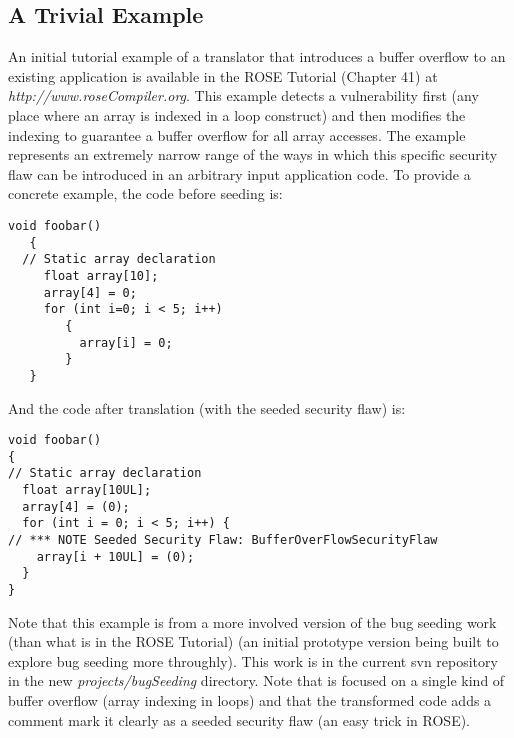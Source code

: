 \subsection{A Trivial Example}

   An initial tutorial example of a translator that introduces a 
buffer overflow to an existing application is available in the ROSE Tutorial
(Chapter 41) at {\em http://www.roseCompiler.org}.  This example detects a
vulnerability first (any place where an array is indexed in a loop construct)
and then modifies the indexing to guarantee a buffer overflow for all
array accesses.  The example represents an extremely narrow range of
the ways in which this specific security flaw can be introduced in an
arbitrary input application code.  To provide a concrete example, the code 
before seeding is:
{\mySmallFontSize
\begin{verbatim}
void foobar()
   {
  // Static array declaration
     float array[10];
     array[4] = 0;
     for (int i=0; i < 5; i++)
        {
          array[i] = 0;
        }
   }
\end{verbatim}
}
And the code after translation (with the seeded security flaw) is:
{\mySmallFontSize
\begin{verbatim}
void foobar()
{
// Static array declaration
  float array[10UL];
  array[4] = (0);
  for (int i = 0; i < 5; i++) {
// *** NOTE Seeded Security Flaw: BufferOverFlowSecurityFlaw 
    array[i + 10UL] = (0);
  }
}
\end{verbatim}
}
Note that this example is from a more involved version of the bug seeding
work (than what is in the ROSE Tutorial) (an initial prototype version being 
built to explore bug seeding more throughly). This work is in the current 
svn repository in the new {\em projects/bugSeeding} directory. Note that is
focused on a single kind of buffer overflow (array indexing in loops) and
that the transformed code adds a comment mark it clearly as a seeded security 
flaw (an easy trick in ROSE).
